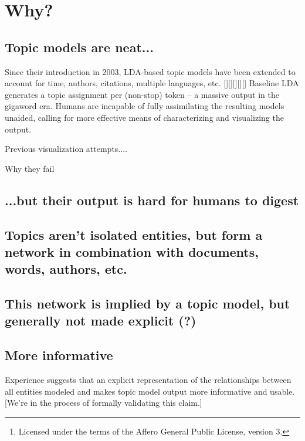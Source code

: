 \documentclass[a4paper,10pt]{article}
\title{}
\author{}
\begin{document}
\maketitle

\begin{abstract}
The Topic Browser is an open-source\footnote{Licensed under the terms of the Affero General Public License, version 3.}  web application for interactive exploration and visualization of topics and documents. Mallet LDA output is used as input. We explain why such a tool is warranted, what it is capable of, and how to use it to explore the corpus (or topic model) of your choice.
\end{abstract}

\section{Why?}
\subsection{Topic models are neat...}
Since their introduction in 2003, LDA-based topic models have been extended to account for time, authors, citations, multiple languages, etc. [][][][][] Baseline LDA generates a topic assignment per (non-stop) token -- a massive output in the gigaword era. Humans are incapable of fully assimilating the resulting models unaided, calling for more effective means of characterizing and visualizing the output. 

Previous visualization attempts....

Why they fail





\subsection{...but their output is hard for humans to digest}
\subsection{Topics aren't isolated entities, but form a network in combination with documents, words, authors, etc.}
\subsection{This network is implied by a topic model, but generally not made explicit (?)}
\subsection{More informative}
Experience suggests that an explicit representation of the relationships between all entities modeled and makes topic model output more informative and usable.
[We're in the process of formally validating this claim.]
\end{document}
